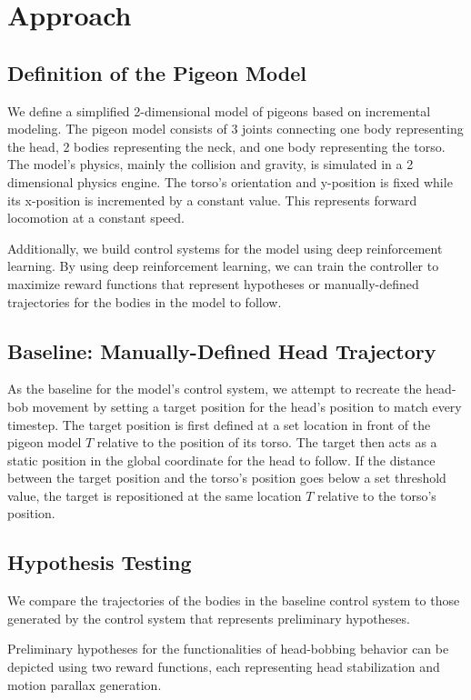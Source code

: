 \chapter{Approach}
\section{Definition of the Pigeon Model}
  We define a simplified 2-dimensional model of pigeons based on incremental modeling. The pigeon model consists of 3 joints connecting one body representing the head, 2 bodies representing the neck, and one body representing the torso. The model's physics, mainly the collision and gravity, is simulated in a 2 dimensional physics engine. The torso's orientation and y-position is fixed while its x-position is incremented by a constant value. This represents forward locomotion at a constant speed.

  Additionally, we build control systems for the model using deep reinforcement learning. By using deep reinforcement learning, we can train the controller to maximize reward functions that represent hypotheses or manually-defined trajectories for the bodies in the model to follow.

\section{Baseline: Manually-Defined Head Trajectory}
  As the baseline for the model's control system, we attempt to recreate the head-bob movement by setting a target position for the head's position to match every timestep. The target position is first defined at a set location in front of the pigeon model $T$ relative to the position of its torso. The target then acts as a static position in the global coordinate for the head to follow. If the distance between the target position and the torso's position goes below a set threshold value, the target is repositioned at the same location $T$ relative to the torso's position.

\section{Hypothesis Testing}
  We compare the trajectories of the bodies in the baseline control system to those generated by the control system that represents preliminary hypotheses.

  Preliminary hypotheses for the functionalities of head-bobbing behavior can be depicted using two reward functions, each representing head stabilization and motion parallax generation.

